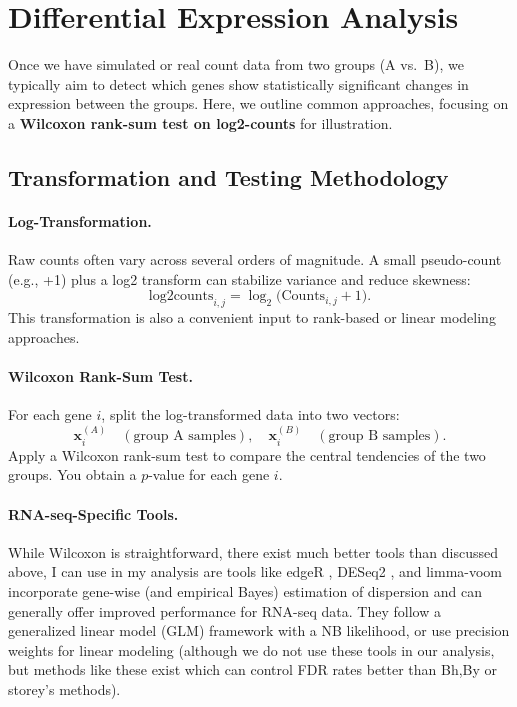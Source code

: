 \documentclass[12pt]{article}
\begin{document}
\section{Differential Expression Analysis}
\label{sec:deanalysis}

Once we have simulated or real count data from two groups (A vs.\ B), we typically aim to detect which genes show statistically significant changes in expression between the groups. Here, we outline common approaches, focusing on a \textbf{Wilcoxon rank-sum test on log2-counts} for illustration.
\subsection{Transformation and Testing Methodology}

\paragraph{Log-Transformation.} Raw counts often vary across several orders of magnitude. A small pseudo-count (e.g., +1) plus a log2 transform can stabilize variance and reduce skewness:
\[
\text{log2counts}_{i,j} = \log_2\big(\text{Counts}_{i,j} + 1\big).
\]
This transformation is also a convenient input to rank-based or linear modeling approaches.

\paragraph{Wilcoxon Rank-Sum Test.} For each gene $i$, split the log-transformed data into two vectors: 
\[
\boldsymbol{x}_i^{(A)} \quad (\text{group A samples}), \quad
\boldsymbol{x}_i^{(B)} \quad (\text{group B samples}).
\]
Apply a Wilcoxon rank-sum test to compare the central tendencies of the two groups. You obtain a $p$-value for each gene $i$. 

\paragraph{RNA-seq-Specific Tools.} While Wilcoxon is straightforward, there exist much better tools than discussed above, I can use in my analysis are tools like \textsf{edgeR} , \textsf{DESeq2} , and \textsf{limma-voom}  incorporate gene-wise (and empirical Bayes) estimation of dispersion and can generally offer improved performance for RNA-seq data. They follow a generalized linear model (GLM) framework with a NB likelihood, or use precision weights for linear modeling (although we do not use these tools in our analysis, but methods like these exist which can control FDR rates better than Bh,By or storey's methods).
\end{document}
